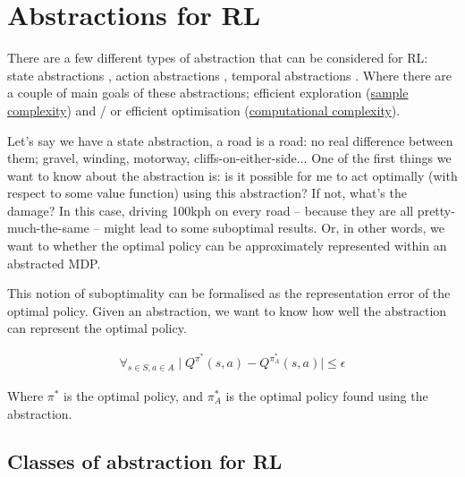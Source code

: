 \section{Abstractions for RL}

There are a few different types of abstraction that can be considered for RL:
state abstractions \cite{Littman2006,Haarnoja,Cuccu2018,Zhonga,Vezzani2019,Abel2018,Duan2018,Abel2017,Silver2016a},
action abstractions \cite{Chandak2019,Bester2019,Tennenholtz2019}, temporal abstractions \cite{Rafati,Mankowitz2018,Harutyunyan2017,Fruit2017,Riemer2018,Bacon2018,Achiam2018,Pham2019,Konidaris2018,Haarnoja,Sutton1999,Fruit2017a,Bacon2016a,Jinnai2018,Nachum2018}.
Where there are a couple of main goals of these abstractions; efficient exploration
(\href{https://en.wikipedia.org/wiki/Sample_complexity}{sample complexity})
and / or efficient optimisation (\href{https://en.wikipedia.org/wiki/Computational_complexity_theory}{computational complexity}).

Let's say we have a state abstraction, a road is a road: no real difference
between them; gravel, winding, motorway, cliffs-on-either-side...
One of the first things we want to know about the abstraction is:
is it possible for me to act optimally (with respect to some value function)
using this abstraction? If not, what's the damage? In this case, driving 100kph on every road --
because they are all pretty-much-the-same -- might lead to some suboptimal results.
Or, in other words, we want to whether the optimal policy can be approximately represented within an abstracted MDP.

This notion of suboptimality can be formalised as the representation error of the optimal
policy. Given an abstraction, we want to know how well
the abstraction can represent the optimal policy. \cite{Littman2006, Abel2017}

\begin{align}
\forall_{s\in S, a\in A} \mid Q^{\pi^* }(s, a) - Q^{\pi_{A}^* }(s, a) \mid \le \epsilon
\end{align}

Where $\pi^{* }$ is the optimal policy, and $\pi_{A}^{* }$ is the optimal
policy found using the abstraction.

\subsection{Classes of abstraction for RL}

